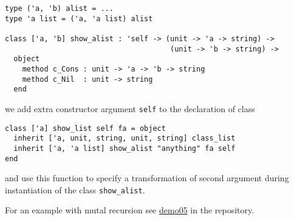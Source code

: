 \documentclass[acmsmall,review,anonymous]{acmart}\settopmatter{printfolios=true,printccs=false,printacmref=false}
\begin{document}
\begin{lstlisting}
type ('a, 'b) alist = ...
type 'a list = ('a, 'a list) alist

class ['a, 'b] show_alist : 'self -> (unit -> 'a -> string) ->
                                      (unit -> 'b -> string) ->
  object
    method c_Cons : unit -> 'a -> 'b -> string
    method c_Nil  : unit -> string
  end
\end{lstlisting}

we add extra constructor argument \lstinline{self} to the declaration of class
\begin{lstlisting}
class ['a] show_list self fa = object
  inherit ['a, unit, string, unit, string] class_list
  inherit ['a, 'a list] show_alist "anything" fa self
end
\end{lstlisting}
and use this function to specify a transformation of second argument during instantiation of the class \lstinline{show_alist}.

% 
  
For an example with mutal recursion see \href{https://github.com/Kakadu/gt-demo/blob/master/src/demo05mutal.ml}{demo05} in the repository.
\end{document}
